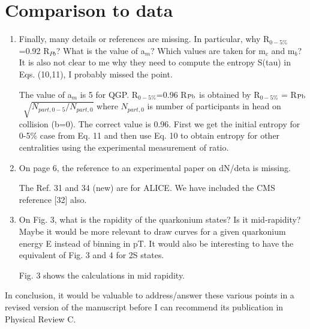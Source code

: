 \documentclass[aps,prc,preprint,superscriptaddress,showpacs,showkeys]{revtex4-1}
\begin{document}
\section{Comparison to data}
\begin{enumerate}

\item { \color{red} Finally, many details or references are missing. In particular, why
R$_{0-5\%}$=0.92 R$_{Pb}$? What is the value of a$_m$? Which values are taken
for m$_c$ and m$_b$? It is also not clear to me why they need to compute
the entropy S(tau) in Eqs. (10,11), I probably missed the point.}

{\color{blue} The value of a$_m$ is 5 for QGP. %
  R$_{0-5\%}$=0.96 R$_{\rm Pb}$ is obtained by  R$_{0-5\%}$ = R$_{\rm Pb}$ \, $\sqrt{N_{part,0-5}/N_{part,0}}$
where $N_{part,0}$ is number of participants in head on collision (b=0). The correct value is 0.96. 
 First we get the initial entropy for 0-5\% case from Eq. 11 and then use Eq. 10 to obtain entropy for
other centralities using the experimental measurement of ratio. 
}


\item { \color{red} On page 6, the reference to an experimental paper on dN/deta is
missing.}

{\color{blue} The Ref. 31 and 34 (new) are for ALICE. We have included the CMS reference [32] also.}


\item { \color{red} On Fig. 3, what is the rapidity of the quarkonium states? Is it
mid-rapidity? Maybe it would be more relevant to draw curves for a
given quarkonium energy E instead of binning in pT. It would also be
interesting to have the equivalent of Fig. 3 and 4 for 2S states.}

{\color{blue} 
Fig. 3 shows the calculations in mid rapidity. 
}

\end{enumerate}

{ \color{red} In conclusion, it would be valuable to address/answer these various
points in a revised version of the manuscript before I can recommend
its publication in Physical Review C.}
\end{document}
